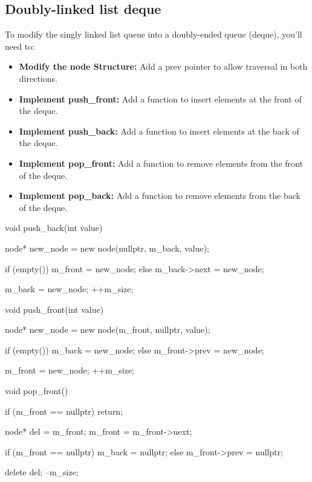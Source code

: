 \documentclass{report}
\begin{document}
    \subsection{Doubly-linked list deque}
    \bigbreak \noindent 
    To modify the singly linked list queue into a doubly-ended queue (deque), you'll need to:
    \begin{itemize}
        \item \textbf{Modify the node Structure:} Add a prev pointer to allow traversal in both directions.
        \item \textbf{Implement push\_front:} Add a function to insert elements at the front of the deque.
        \item \textbf{Implement push\_back:} Add a function to insert elements at the back of the deque.
        \item \textbf{Implement pop\_front:} Add a function to remove elements from the front of the deque.
        \item \textbf{Implement pop\_back:} Add a function to remove elements from the back of the deque.
    \end{itemize}
    \bigbreak \noindent 

    \bigbreak \noindent 
    \begin{cppcode}
    void push_back(int value) {
        node* new_node = new node(nullptr, m_back, value);

        if (empty()) {
            m_front = new_node;
        } else {
            m_back->next = new_node;
        }

        m_back = new_node;
        ++m_size;
    }

    void push_front(int value) {
        node* new_node = new node(m_front, nullptr, value);

        if (empty()) {
            m_back = new_node;
        } else {
            m_front->prev = new_node;
        }

        m_front = new_node;
        ++m_size;
    }

    void pop_front() {
        if (m_front == nullptr) return;

        node* del = m_front;
        m_front = m_front->next;

        if (m_front == nullptr) {
            m_back = nullptr;
        } else {
            m_front->prev = nullptr;
        }

        delete del;
        --m_size;
    }
    \end{cppcode}
\end{document}
